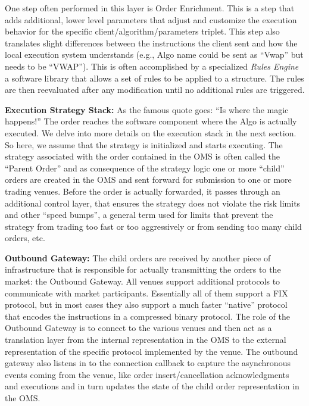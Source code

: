 One step often performed in this layer is Order Enrichment. This is a step that adds additional, lower level parameters that adjust and customize the execution behavior for the specific client/algorithm/parameters triplet. This step also translates slight differences between the instructions the client sent and how the local execution system understands (e.g., Algo name could be sent as ``Vwap'' but needs to be ``VWAP''). This is often accomplished by a specialized \emph{Rules Engine} a software library that allows a set of rules to be applied to a structure. The rules are then reevaluated after any modification until no additional rules are triggered. \twomedskip


\noindent\textbf{Execution Strategy Stack:} As the famous quote goes: ``Is where the magic happens!'' The order reaches the software component where the Algo is actually executed. We delve into more details on the execution stack in the next section. So here, we assume that the strategy is initialized and starts executing. The strategy associated with the order contained in the OMS is often called the ``Parent Order'' and as consequence of the strategy logic one or more ``child'' orders  are created in the OMS and sent forward for submission to one or more trading venues. Before the order is actually forwarded, it passes through an additional control layer, that ensures the strategy does not violate the risk limits and other ``speed bumps'', a general term used for limits that prevent the strategy from trading too fast or too aggressively or from sending too many child orders, etc. \twomedskip


\noindent\textbf{Outbound Gateway:} The child orders are received by another piece of infrastructure that is responsible for actually transmitting the orders to the market: the Outbound Gateway. All venues support additional protocols to communicate with market participants. Essentially all of them support a FIX protocol, but in most cases they also support a much faster ``native'' protocol that encodes the instructions in a compressed binary protocol. The role of the Outbound Gateway is to connect to the various venues and then act as a translation layer from the internal representation in the OMS to the external representation of the specific protocol implemented by the venue. The outbound gateway also listens in to the connection callback to capture the asynchronous events coming from the venue, like order insert/cancellation acknowledgments and executions and in turn updates the state of the child order representation in the OMS. \twomedskip


